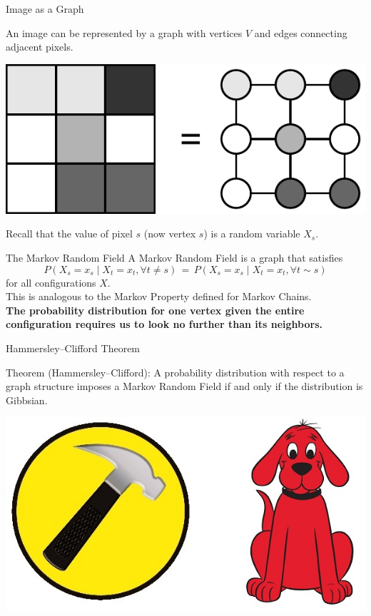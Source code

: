 \documentclass[10pt]{beamer}
\begin{document}
\begin{frame}{Image as a Graph}

An image can be represented by a graph with vertices $V$ and edges connecting adjacent pixels.

\begin{center}
\includegraphics[scale=0.7]{img/lattice_graph}
\end{center}

Recall that the value of pixel $s$ (now vertex $s$) is a random variable $X_s$.

\end{frame}

\begin{frame}{The Markov Random Field}
A Markov Random Field is a graph that satisfies
\[ P(X_s = x_s \mid X_t = x_t, \forall t \neq s) \,=\, P(X_s = x_s \mid X_t = x_t, \forall t \sim s) \]
for all configurations $X$.
\\[2ex]
This is analogous to the Markov Property defined for Markov Chains.
\\[2ex]
\textbf{The probability distribution for one vertex given the entire configuration requires us to look no further than its neighbors.}
\end{frame}

\begin{frame}{Hammersley--Clifford Theorem}
\begin{block}{Theorem (Hammersley--Clifford):}
A probability distribution with respect to a graph structure imposes a Markov Random Field if and only if the distribution is Gibbsian.
\end{block}

\begin{center}
\includegraphics[width = 0.5\linewidth]{img/hammersley-clifford}
\end{center}
 \end{frame}
\end{document}

